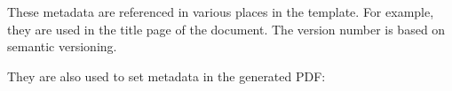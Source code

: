 These metadata are referenced in various places in the template. For example,
they are used in the title page of the document. The version number is based
on semantic versioning.


They are also used to set metadata in the generated PDF:

